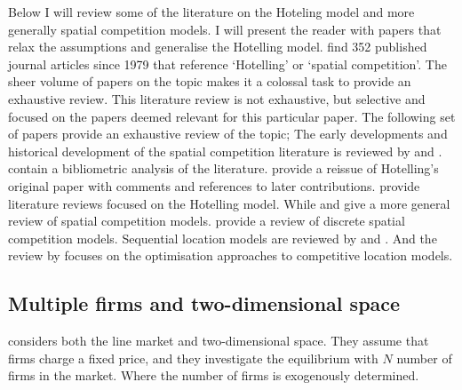 \documentclass[preprint, 12pt]{elsarticle}
\begin{document}
Below I will review some of the literature on the Hoteling model and more generally spatial competition models. I will present the reader with papers that relax the assumptions and generalise the Hotelling model. \citet{Biscaia_Mota_2013} find 352 published journal articles since 1979 that reference `Hotelling' or `spatial competition'. The sheer volume of papers on the topic makes it a colossal task to provide an exhaustive review. This literature review is not exhaustive, but selective and focused on the papers deemed relevant for this particular paper. The following set of papers provide an exhaustive review of the topic; The early developments and historical development of the spatial competition literature is reviewed by \citet[chapter~1]{Eiselt_Marianov_2011} and \citet{Smith_Laporte_Harper_2009}. \citet{Biscaia_Mota_2013} contain a bibliometric analysis of the literature. \citet{Eiselt_2011} provide a reissue of Hotelling's original paper with comments and references to later contributions. \citet{Graitson_1982, Brenner_2001, Eiselt_Laporte_Thisse_1993} provide literature reviews focused on the Hotelling model. While \citet{Kilkenny_Thisse_1999} and \citet{ReVelle_Eiselt_2005} give a more general review of spatial competition models. \citet{Daskin_2008} provide a review of discrete spatial competition models. Sequential location models are reviewed by \citet{Eiselt_Laporte_1996} and \citet{Kress_Pesch_2012}. And the review by \citet{Plastria_2001} focuses on the optimisation approaches to competitive location models.

\subsection{Multiple firms and two-dimensional space}

\citet{Eaton_Lipsey_1975} considers both the line market and two-dimensional space. They assume that firms charge a fixed price, and they investigate the equilibrium with $N$ number of firms in the market. Where the number of firms is exogenously determined.
\end{document}
